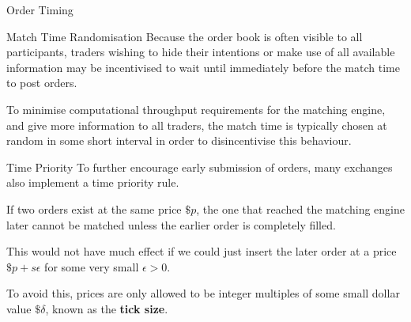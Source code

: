 \documentclass{beamer}
\begin{document}
\begin{frame}{Order Timing}
	\begin{block}{Match Time Randomisation}
		Because the order book is often visible to all participants, traders wishing to hide their intentions or make use of all available information may be incentivised to wait until immediately before the match time to post orders.

		To minimise computational throughput requirements for the matching engine, and give more information to all traders, the match time is typically chosen at random in some short interval in order to disincentivise this behaviour.

	\end{block}

	\pause

	\begin{block}{Time Priority}
		To further encourage early submission of orders, many exchanges also implement a time priority rule.%

		If two orders exist at the same price $\$p$, the one that reached the matching engine later cannot be matched unless the earlier order is completely filled.

		This would not have much effect if we could just insert the later order at a price $\$p+s\epsilon$ for some very small $\epsilon>0$.%

		To avoid this, prices are only allowed to be integer multiples of some small dollar value $\$\delta$, known as the \textbf{tick size}.%
	\end{block}
\end{frame}
\end{document}
